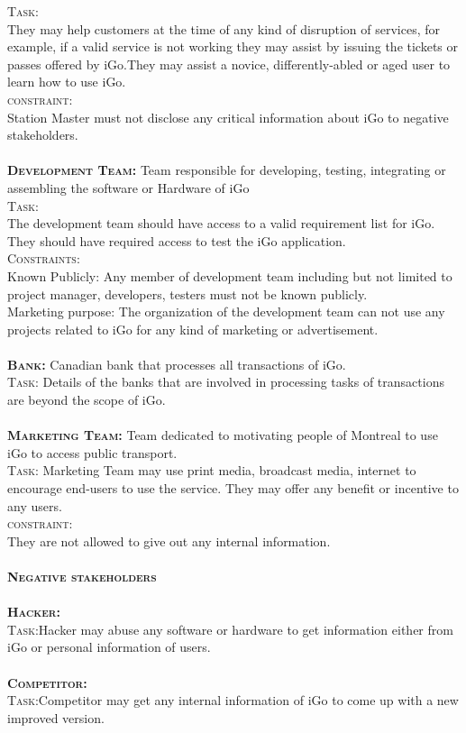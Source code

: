 \documentclass[a4paper, 11pt]{report}
\begin{document}
\textsc{\large Task:} \\ They may help customers at the time of any kind of disruption of services, for example, if a valid service is not working they may assist by issuing the tickets or passes offered by iGo.They may assist a novice, differently-abled or aged user to learn how to use iGo. \\
\textsc{\large constraint:} \\Station Master must not disclose any critical information about iGo to negative stakeholders. \\\\
\textsc{\large \bf Development Team:} Team responsible for developing, testing, integrating or assembling the software or Hardware of iGo \\
\textsc{\large Task:}\\ The development team should have access to a valid requirement list for iGo. They should have required access to test the iGo application.\\
\textsc{\large Constraints:} \\
Known Publicly: Any member of development team including but not limited to project manager, developers, testers must not be known publicly.\\
Marketing purpose: The organization of the development team can not use any projects related to iGo for any kind of marketing or advertisement.\\\\
\textsc{\large \bf  Bank:} Canadian bank that processes all transactions of iGo.\\
\textsc{\large  Task:} Details of the banks that are involved in processing tasks of transactions are beyond the scope of iGo.\\\\
\textsc{\large \bf  Marketing Team:} Team dedicated to motivating people of Montreal to use iGo to access public transport. \\
\textsc{\large Task:} Marketing Team may use print media, broadcast media, internet to encourage end-users to use the service. They may offer any benefit or incentive to any users. \\
\textsc{\large constraint:}\\They are not allowed to give out any internal information. \\\\
\textsc{\large \bf Negative stakeholders}\\\\
\textsc{\large \bf  Hacker:} \\
\textsc{\large  Task:}Hacker may abuse any software or hardware to get information either from iGo or personal information of users.\\\\
\textsc{\large \bf  Competitor:}\\
\textsc{\large  Task:}Competitor may get any internal information of iGo to come up with a new improved version.
\end{document}
